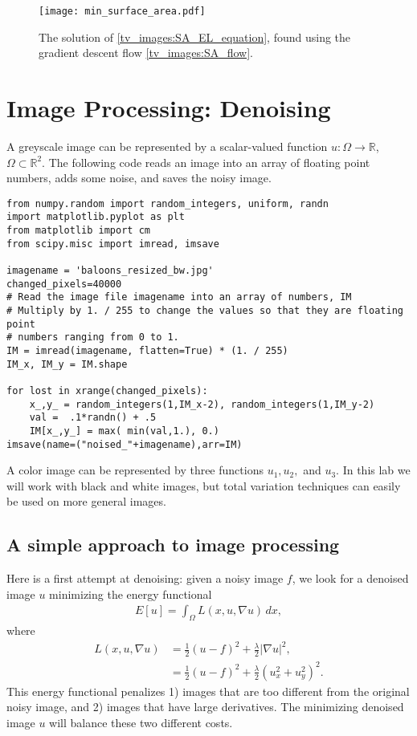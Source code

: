 \begin{figure}
\centering
\texttt{[image: min\_surface\_area.pdf]}
\caption{The solution of \eqref{tv_images:SA_EL_equation}, found using the gradient descent flow \eqref{tv_images:SA_flow}.}
\label{fig:tv_images:SA_image}
\end{figure}


\section*{Image Processing: Denoising}
A greyscale image can be represented by a scalar-valued function $u:\Omega \to \mathbb{R}$, $\Omega \subset \mathbb{R}^2$. The following code reads an image into an array of floating point numbers, adds some noise, and saves the noisy image. 
\begin{lstlisting}
from numpy.random import random_integers, uniform, randn
import matplotlib.pyplot as plt
from matplotlib import cm
from scipy.misc import imread, imsave

imagename = 'baloons_resized_bw.jpg'
changed_pixels=40000
# Read the image file imagename into an array of numbers, IM
# Multiply by 1. / 255 to change the values so that they are floating point
# numbers ranging from 0 to 1.
IM = imread(imagename, flatten=True) * (1. / 255)
IM_x, IM_y = IM.shape
	
for lost in xrange(changed_pixels):
	x_,y_ = random_integers(1,IM_x-2), random_integers(1,IM_y-2)
	val =  .1*randn() + .5
	IM[x_,y_] = max( min(val,1.), 0.)
imsave(name=("noised_"+imagename),arr=IM)	
\end{lstlisting}
A color image can be represented by three functions $u_1, u_2,$ and $u_3$. In this lab we will work with black and white images, but total variation techniques can easily be used on more general images. 

\subsection*{A simple approach to image processing}
Here is a first attempt at denoising: given a noisy image $f$, we look for a denoised image $u$ minimizing the energy functional 
\begin{align}
E[u] = \int_{\Omega} L(x,u,\nabla u) \, dx, \label{tv_images:diffusion}
\end{align}
where
\begin{align*}
L(x,u,\nabla u) &= \frac{1}{2}(u-f)^2 + \frac{\lambda}{2} | \nabla u|^2,\\
&= \frac{1}{2}(u-f)^2 + \frac{\lambda}{2} (u_x^2 + u_y^2)^2.
\end{align*}
This energy functional penalizes 1) images that are too different from the original noisy image, and 2) images that have large derivatives. The minimizing denoised image $u$ will balance these two different costs. 

